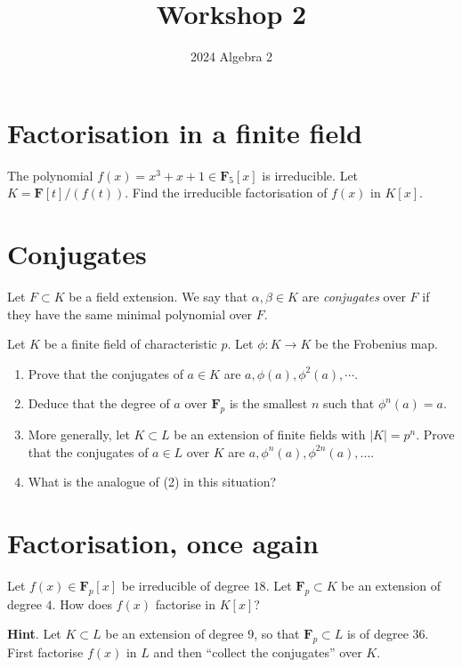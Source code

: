 \documentclass[12pt]{amsart}
\author{2024 Algebra 2}
\date{}
\title{Workshop 2}
\begin{document}
\maketitle
\section{Factorisation in a finite field}
\label{sec:orga19c1be}
The polynomial \(f(x) = x^3+x+1 \in \mathbf{F}_5[x]\) is irreducible.
Let \(K = \mathbf{F}[t]/(f(t))\).
Find the irreducible factorisation of \(f(x)\) in \(K[x]\).
\section{Conjugates}
\label{sec:orgfcda976}
Let \(F \subset K\) be a field extension.
We say that \(\alpha, \beta \in K\) are \emph{conjugates} over \(F\) if they have the same minimal polynomial over \(F\).

Let \(K\) be a finite field of characteristic \(p\).
Let \(\phi \colon K \to K\) be the Frobenius map.
\begin{enumerate}
\item Prove that the conjugates of \(a \in K\) are \(a, \phi(a), \phi^2(a), \cdots\).
\item Deduce that the degree of \(a\) over \(\mathbf{F}_p\) is the smallest \(n\) such that \(\phi^n(a) = a\).
\item More generally, let \(K \subset L\) be an extension of finite fields with \(|K| = p^n\).
Prove that the conjugates of \(a \in L\) over \(K\) are \(a, \phi^n(a), \phi^{2n}(a), \dots\).
\item What is the analogue of (2) in this situation?
\end{enumerate}
\section{Factorisation, once again}
\label{sec:orgc753beb}
Let \(f(x) \in \mathbf{F}_p[x]\) be irreducible of degree \(18\).
Let \(\mathbf{F}_p \subset K\) be an extension of degree \(4\).
How does \(f(x)\) factorise in \(K[x]\)?

\noindent
\textbf{Hint}.  Let \(K \subset L\) be an extension of degree 9, so that \(\mathbf{F}_p \subset L\) is of degree 36.  First factorise \(f(x)\) in \(L\) and then ``collect the conjugates'' over \(K\).
\end{document}

